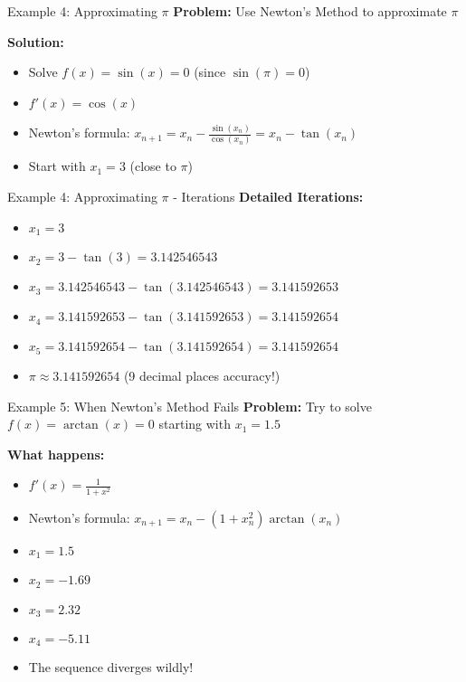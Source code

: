 \documentclass[aspectratio=169]{beamer}
\begin{document}
\begin{frame}{Example 4: Approximating $\pi$}
\textbf{Problem:} Use Newton's Method to approximate $\pi$

\textbf{Solution:}
\begin{itemize}
    \item Solve $f(x) = \sin(x) = 0$ (since $\sin(\pi) = 0$)
    \item $f'(x) = \cos(x)$
    \item Newton's formula: $x_{n+1} = x_n - \frac{\sin(x_n)}{\cos(x_n)} = x_n - \tan(x_n)$
    \item Start with $x_1 = 3$ (close to $\pi$)
\end{itemize}
\end{frame}

\begin{frame}{Example 4: Approximating $\pi$ - Iterations}
\textbf{Detailed Iterations:}
\begin{itemize}
    \item $x_1 = 3$
    \item $x_2 = 3 - \tan(3) = 3.142546543$
    \item $x_3 = 3.142546543 - \tan(3.142546543) = 3.141592653$
    \item $x_4 = 3.141592653 - \tan(3.141592653) = 3.141592654$
    \item $x_5 = 3.141592654 - \tan(3.141592654) = 3.141592654$
    \item $\pi \approx 3.141592654$ (9 decimal places accuracy!)
\end{itemize}
\end{frame}

\begin{frame}{Example 5: When Newton's Method Fails}
\textbf{Problem:} Try to solve $f(x) = \arctan(x) = 0$ starting with $x_1 = 1.5$

\textbf{What happens:}
\begin{itemize}
    \item $f'(x) = \frac{1}{1 + x^2}$
    \item Newton's formula: $x_{n+1} = x_n - (1 + x_n^2)\arctan(x_n)$
    \item $x_1 = 1.5$
    \item $x_2 = -1.69$
    \item $x_3 = 2.32$
    \item $x_4 = -5.11$
    \item The sequence diverges wildly!
\end{itemize}
\end{frame}
\end{document}
